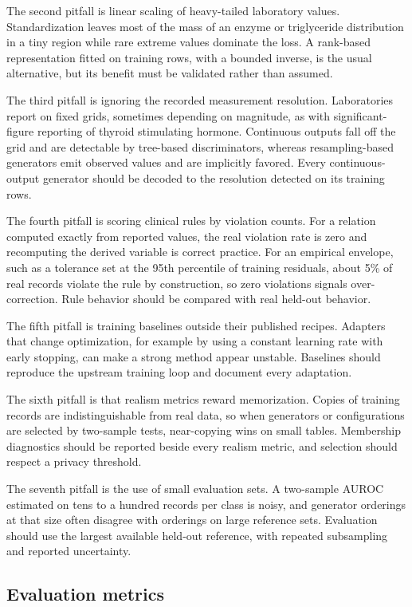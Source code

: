 \documentclass[pdflatex,referee]{sn-jnl}%
\begin{document}
The second pitfall is linear scaling of heavy-tailed laboratory values. Standardization leaves most of the mass of an enzyme or triglyceride distribution in a tiny region while rare extreme values dominate the loss. A rank-based representation fitted on training rows, with a bounded inverse, is the usual alternative, but its benefit must be validated rather than assumed.

The third pitfall is ignoring the recorded measurement resolution. Laboratories report on fixed grids, sometimes depending on magnitude, as with significant-figure reporting of thyroid stimulating hormone. Continuous outputs fall off the grid and are detectable by tree-based discriminators, whereas resampling-based generators emit observed values and are implicitly favored. Every continuous-output generator should be decoded to the resolution detected on its training rows.

The fourth pitfall is scoring clinical rules by violation counts. For a relation computed exactly from reported values, the real violation rate is zero and recomputing the derived variable is correct practice. For an empirical envelope, such as a tolerance set at the 95th percentile of training residuals, about 5\% of real records violate the rule by construction, so zero violations signals over-correction. Rule behavior should be compared with real held-out behavior.

The fifth pitfall is training baselines outside their published recipes. Adapters that change optimization, for example by using a constant learning rate with early stopping, can make a strong method appear unstable. Baselines should reproduce the upstream training loop and document every adaptation.

The sixth pitfall is that realism metrics reward memorization. Copies of training records are indistinguishable from real data, so when generators or configurations are selected by two-sample tests, near-copying wins on small tables. Membership diagnostics should be reported beside every realism metric, and selection should respect a privacy threshold.

The seventh pitfall is the use of small evaluation sets. A two-sample AUROC estimated on tens to a hundred records per class is noisy, and generator orderings at that size often disagree with orderings on large reference sets. Evaluation should use the largest available held-out reference, with repeated subsampling and reported uncertainty.

\subsection*{Evaluation metrics}
\end{document}
